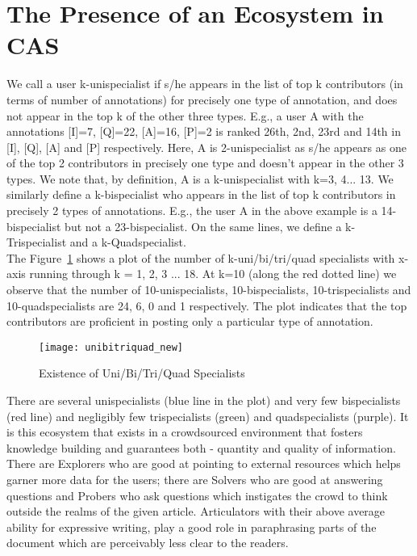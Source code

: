 \documentclass{llncs}
\begin{document}
\section{The Presence of an Ecosystem in CAS}
We call a user k-unispecialist if s/he appears in the list of top k contributors (in terms of number of annotations) for precisely one type of annotation, and does not appear in the top k of the other three types. E.g., a user A with the annotations [I]=7, [Q]=22, [A]=16, [P]=2 is ranked 26th, 2nd, 23rd and 14th in [I], [Q], [A] and [P] respectively. Here, A is 2-unispecialist as s/he appears as one of the top 2 contributors in precisely one type and doesn’t appear in the other 3 types. We note that, by definition, A is a k-unispecialist with k=3, 4... 13. We similarly define a k-bispecialist who appears in the list of top k contributors in precisely 2 types of annotations. E.g., the user A in the above example is a 14-bispecialist but not a 23-bispecialist. On the same lines, we define a k-Trispecialist and a k-Quadspecialist. \\

The Figure~\ref{fig:unibitriquad} shows a plot of the number of k-uni/bi/tri/quad specialists with x-axis running through k = 1, 2, 3 ... 18. At k=10 (along the red dotted line) we observe that the number of 10-unispecialists, 10-bispecialists, 10-trispecialists and 10-quadspecialists are 24, 6, 0 and 1 respectively. The plot indicates that the top contributors are proficient in posting only a particular type of annotation. 
 
\begin{figure}
\centering
\texttt{[image: unibitriquad\_new]}
\caption{Existence of Uni/Bi/Tri/Quad Specialists}
\label{fig:unibitriquad}
\end{figure}
  
There are several unispecialists (blue line in the plot) and very few bispecialists (red line) and negligibly few trispecialists (green) and quadspecialists (purple). It is this ecosystem that exists in a crowdsourced environment that fosters knowledge building and guarantees both - quantity and quality of information. There are Explorers who are good at pointing to external resources which helps garner more data for the users; there are Solvers who are good at answering questions and Probers who ask questions which instigates the crowd to think outside the realms of the given article. Articulators with their above average ability for expressive writing, play a good role in paraphrasing parts of the document which are perceivably less clear to the readers.\\
\end{document}
